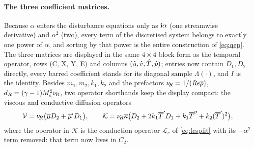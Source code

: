 \documentclass[11pt]{article}
\begin{document}
\paragraph{The three coefficient matrices.} Because $\alpha$ enters the disturbance equations only
as $\mathrm{i}\alpha$ (one streamwise derivative) and $\alpha^2$ (two), every term of the discretised
system belongs to exactly one power of $\alpha$, and sorting by that power is the entire
construction of \eqref{eq:qep}. The three matrices are displayed in the same $4\times4$ block form
as the temporal operator, rows (C, X, Y, E) and columns $(\hat{u},\hat{v},\hat{T},\hat{p})$; entries now
contain $D_1,D_2$ directly, every barred coefficient stands for its diagonal sample
$\Lambda(\cdot)$, and $I$ is the identity. Besides $m_1,m_2,k_1,k_2$ and the prefactors
$\nu_{\!R}=1/(\mathit{Re}\overline{\rho})$, $d_R=(\gamma-1)M_e^2\nu_{\!R}$, two operator shorthands keep the display
compact: the viscous and conductive diffusion operators
\begin{equation}\label{eq:VKops}
  \mathcal V=\nu_{\!R}\big(\overline{\mu} D_2+\overline{\mu}'D_1\big),\qquad
  \mathcal K=\nu_{\!R}\overline{\kappa}\big(D_2+2k_1\overline{T}'D_1+k_1\overline{T}''+k_2(\overline{T}')^2\big),
\end{equation}
where the operator in $\mathcal K$ is the conduction operator $\mathcal L_c$ of \eqref{eq:lcsplit}
with its $-\alpha^2$ term removed: that term now lives in $C_2$.
\end{document}
